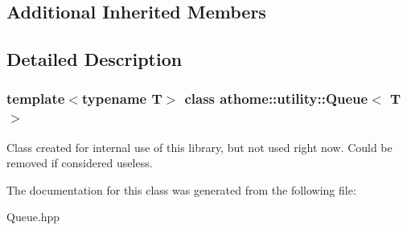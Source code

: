 \subsection*{Additional Inherited Members}


\subsection{Detailed Description}
\subsubsection*{template$<$typename T$>$\newline
class athome\+::utility\+::\+Queue$<$ T $>$}

Class created for internal use of this library, but not used right now. Could be removed if considered useless. 

The documentation for this class was generated from the following file\+:\begin{DoxyCompactItemize}
\item 
Queue.\+hpp\end{DoxyCompactItemize}
